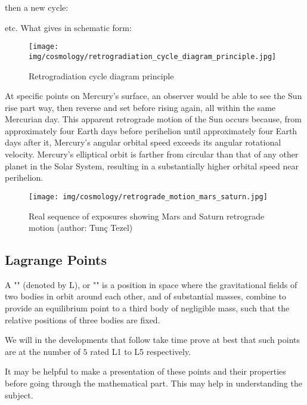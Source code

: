 	then a new cycle:
	
	etc. What gives in schematic form:
	\begin{figure}[H]
		\begin{center}
		\texttt{[image: img/cosmology/retrogradiation\_cycle\_diagram\_principle.jpg]}
		\caption[]{Retrogradiation cycle diagram principle}
		\end{center}	
	\end{figure}
	\begin{tcolorbox}[title=Remark,colframe=black,arc=10pt]
	At specific points on Mercury's surface, an observer would be able to see the Sun rise part way, then reverse and set before rising again, all within the same Mercurian day. This apparent retrograde motion of the Sun occurs because, from approximately four Earth days before perihelion until approximately four Earth days after it, Mercury's angular orbital speed exceeds its angular rotational velocity. Mercury's elliptical orbit is farther from circular than that of any other planet in the Solar System, resulting in a substantially higher orbital speed near perihelion.
	\end{tcolorbox}
	\begin{figure}[H]
		\centering
		\texttt{[image: img/cosmology/retrograde\_motion\_mars\_saturn.jpg]}
		\caption{Real sequence of exposures showing Mars and Saturn retrograde motion (author: Tunç Tezel)}
	\end{figure}
	
	\pagebreak
	\subsection{Lagrange Points}
	A "" (denoted by L), or "" is a position in space where the gravitational fields of two bodies in orbit around each other, and of substantial masses, combine to provide an equilibrium point to a third body of negligible mass, such that the relative positions of three bodies are fixed.

	We will in the developments that follow take time prove at best that such points are at the number of $5$ rated L1 to L5 respectively.

	It may be helpful to make a presentation of these points and their properties before going through the mathematical part. This may help in understanding the subject.

